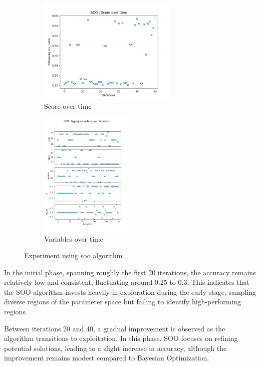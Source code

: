 \begin{figure}[h!]
    \centering
    \begin{subfigure}[b]{.45\textwidth}
      \centering
      \includegraphics[height = 5cm]{assets/img/chap_4/experiments/plots/exp10_score_over_time.png}
      \caption{Score over time}
      \label{fig:exp11_score_time}
    \end{subfigure}%
    \begin{subfigure}[b]{.45\textwidth}
      \centering
      \includegraphics[height = 6cm]{assets/img/chap_4/experiments/plots/exp10_variables_over_time.png}
      \caption{Variables over time}
      \label{fig:exp11_var_time}
    \end{subfigure}
    \caption{Experiment using \acrshort{soo} algorithm}
    \label{fig:exp11_res}
\end{figure}

In the initial phase, spanning roughly the first 20 iterations, the accuracy remains relatively low and consistent, fluctuating around 0.25 to 0.3. This indicates that the SOO algorithm invests heavily in exploration during the early stage, sampling diverse regions of the parameter space but failing to identify high-performing regions.

Between iterations 20 and 40, a gradual improvement is observed as the algorithm transitions to exploitation. In this phase, SOO focuses on refining potential solutions, leading to a slight increase in accuracy, although the improvement remains modest compared to Bayesian Optimization.

